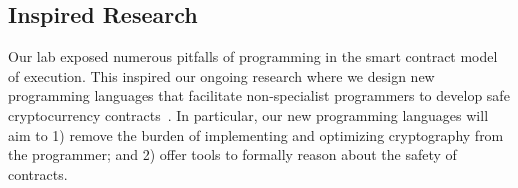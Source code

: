 \documentclass[10pt,twocolumn,letterpaper]{article}
\begin{document}
\subsection{Inspired Research}
Our lab exposed numerous pitfalls of programming  
in the smart contract model of execution.
This inspired our ongoing research 
where we design new programming languages that facilitate
non-specialist programmers 
to develop safe cryptocurrency contracts~\cite{hawk}.
In particular, our new programming languages will aim to 
1) remove the burden of implementing and optimizing cryptography
from  the programmer;
and 
2) offer tools to formally reason about the safety of contracts. 


















\end{document}
